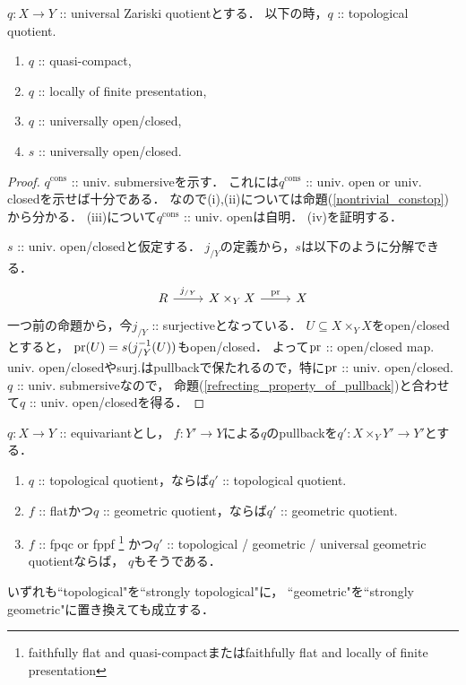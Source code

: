 \documentclass[a4paper, dvipdfmx]{jsarticle}
\newcommand{\cons}{\mathrm{cons}}
\begin{document}
\begin{Lemma}
    $q \colon X \to Y$ :: universal Zariski quotientとする．
    以下の時，$q$ :: topological quotient.
    \begin{enumerate}
        \item $q$ :: quasi-compact,
        \item $q$ :: locally of finite presentation,
        \item $q$ :: universally open/closed,
        \item $s$ :: universally open/closed.
    \end{enumerate}
\end{Lemma}
\begin{proof}
    $q^{\cons}$ :: univ. submersiveを示す．
    これには$q^{\cons}$ :: univ. open or univ. closedを示せば十分である．
    なので(i),(ii)については命題(\ref{nontrivial_constop})から分かる．
    (iii)について$q^{\cons}$ :: univ. openは自明．
    (iv)を証明する．

    $s$ :: univ. open/closedと仮定する．
    $j_{/Y}$の定義から，$s$は以下のように分解できる．
    \[
    \begin{tikzcd}
        R \ar[r, "j_{/Y}"]& X \times_Y X \ar[r, "\pr"]& X
    \end{tikzcd}
    \]
    一つ前の命題から，今$j_{/Y}$ :: surjectiveとなっている．
    $U \subseteq X \times_Y X$をopen/closedとすると，
    $\operatorname{pr}(U)=s(j_{/Y}^{-1}(U))$もopen/closed．
    よって$\operatorname{pr}$ :: open/closed map.
    univ. open/closedやsurj.はpullbackで保たれるので，特に$\operatorname{pr}$ :: univ. open/closed.
    $q$ :: univ. submersiveなので，
    命題(\ref{refrecting_property_of_pullback})と合わせて$q$ :: univ. open/closedを得る．
\end{proof}

\begin{Prop}
    $q \colon X \to Y$ :: equivariantとし，
    $f \colon Y' \to Y$による$q$のpullbackを$q' \colon X \times_{Y} Y' \to Y'$とする．

    \begin{enumerate}
        \item $q$ :: topological quotient，ならば$q'$ :: topological quotient.
        \item $f$ :: flatかつ$q$ :: geometric quotient，ならば$q'$ :: geometric quotient.
        \item $f$ :: fpqc or fppf 
            \footnote{faithfully flat and quasi-compactまたはfaithfully flat and locally of finite presentation}
                かつ$q'$ :: topological / geometric / universal geometric quotientならば，
                $q$もそうである．
    \end{enumerate}
    いずれも``topological"を``strongly topological"に，
    ``geometric"を``strongly geometric"に置き換えても成立する．
\end{Prop}



\end{document}
